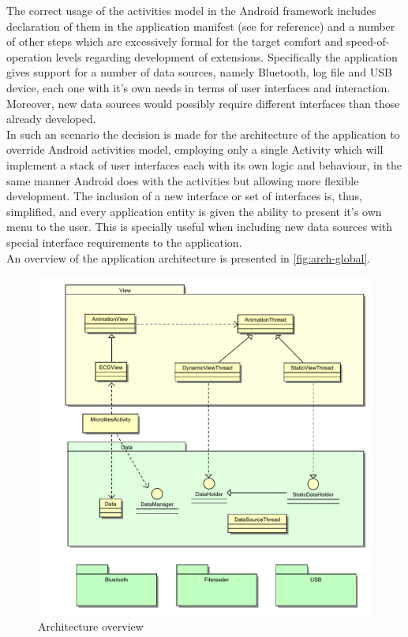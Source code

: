 		The correct usage of the activities model in the Android framework includes declaration of them in the application manifest (see \cite{andev-activity} for reference) and a number of other steps which are excessively formal for the target comfort and speed-of-operation levels regarding development of extensions. Specifically the application gives support for a number of data sources, namely Bluetooth, log file and USB device, each one with it's own needs in terms of user interfaces and interaction. Moreover, new data sources would possibly require different interfaces than those already developed.\\

		In such an scenario the decision is made for the architecture of the application to override Android activities model, employing only a single Activity which will implement a stack of user interfaces each with its own logic and behaviour, in the same manner Android does with the activities but allowing more flexible development. The inclusion of a new interface or set of interfaces is, thus, simplified, and every application entity is given the ability to present it's own menu to the user. This is specially useful when including new data sources with special interface requirements to the application.\\

		An overview of the application architecture is presented in \autoref{fig:arch-global}.

		\begin{figure}[h]
		\includegraphics[scale=0.75]{mlts-arch-main}
		\centering
		\caption{Architecture overview}
		\label{fig:arch-global}
		\end{figure}

